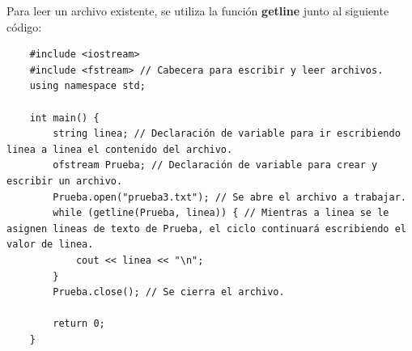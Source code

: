 Para leer un archivo existente, se utiliza la función \textbf{getline} junto al siguiente código:
\begin{lstlisting}
    #include <iostream>
    #include <fstream> // Cabecera para escribir y leer archivos.
    using namespace std;
    
    int main() {
        string linea; // Declaración de variable para ir escribiendo linea a linea el contenido del archivo.
        ofstream Prueba; // Declaración de variable para crear y escribir un archivo.
        Prueba.open("prueba3.txt"); // Se abre el archivo a trabajar.
        while (getline(Prueba, linea)) { // Mientras a linea se le asignen lineas de texto de Prueba, el ciclo continuará escribiendo el valor de linea.
            cout << linea << "\n";
        }
        Prueba.close(); // Se cierra el archivo.
        
        return 0;
    }
\end{lstlisting}